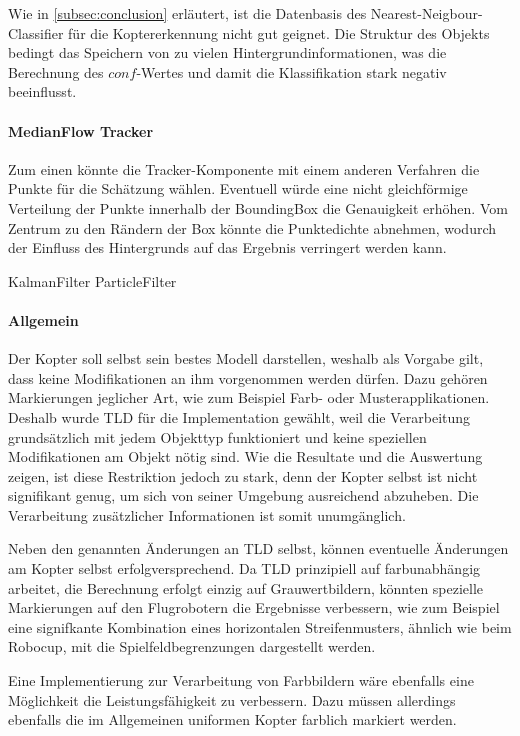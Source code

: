 Wie in \ref{subsec:conclusion} erläutert, ist die Datenbasis des Nearest-Neigbour-Classifier für die Koptererkennung nicht gut geignet. Die Struktur des Objekts bedingt das Speichern von zu vielen Hintergrundinformationen, was die Berechnung des $conf$-Wertes und damit die Klassifikation stark negativ beeinflusst.  

\paragraph{MedianFlow Tracker}
Zum einen könnte die Tracker-Komponente mit einem anderen Verfahren die Punkte für die Schätzung wählen. Eventuell würde eine nicht gleichförmige Verteilung der Punkte innerhalb der BoundingBox die Genauigkeit erhöhen. Vom Zentrum zu den Rändern der Box könnte die Punktedichte abnehmen, wodurch der Einfluss des Hintergrunds auf das Ergebnis verringert werden kann.

KalmanFilter
ParticleFilter

\paragraph{Allgemein}
Der Kopter soll selbst sein bestes Modell darstellen, weshalb als Vorgabe gilt, dass keine Modifikationen an ihm vorgenommen werden dürfen. Dazu gehören Markierungen jeglicher Art, wie zum Beispiel Farb- oder Musterapplikationen. Deshalb wurde TLD für die Implementation gewählt, weil die Verarbeitung grundsätzlich mit jedem Objekttyp funktioniert und keine speziellen Modifikationen am Objekt nötig sind. Wie die Resultate und die Auswertung zeigen, ist diese Restriktion jedoch zu stark, denn der Kopter selbst ist nicht signifikant genug, um sich von seiner Umgebung ausreichend abzuheben. Die Verarbeitung zusätzlicher Informationen ist somit unumgänglich.

Neben den genannten Änderungen an TLD selbst, können eventuelle Änderungen am Kopter selbst erfolgversprechend. Da TLD prinzipiell auf farbunabhängig arbeitet, die Berechnung erfolgt einzig auf Grauwertbildern, könnten spezielle Markierungen auf den Flugrobotern die Ergebnisse verbessern, wie zum Beispiel eine signifkante Kombination eines horizontalen Streifenmusters, ähnlich wie beim Robocup, mit die Spielfeldbegrenzungen dargestellt werden.

Eine Implementierung zur Verarbeitung von Farbbildern wäre ebenfalls eine Möglichkeit die Leistungsfähigkeit zu verbessern. Dazu müssen allerdings ebenfalls die im Allgemeinen uniformen Kopter farblich markiert werden. 



